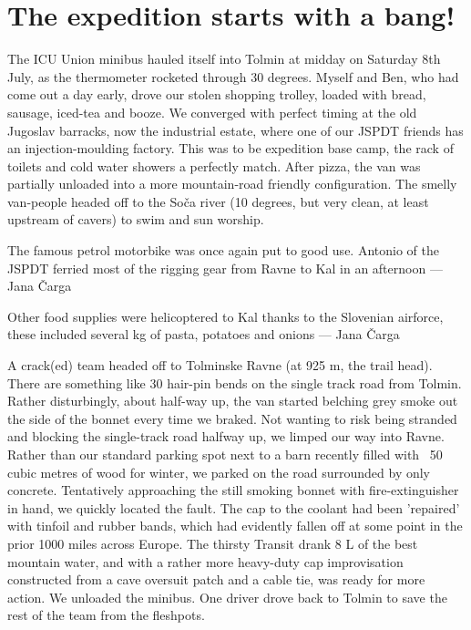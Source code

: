 \section{The expedition starts with a bang!}
The ICU Union minibus hauled itself into Tolmin at midday on Saturday 8th July, as the thermometer rocketed through 30 degrees. Myself and Ben, who had come out a day early, drove our stolen shopping trolley, loaded with bread, sausage, iced-tea and booze. We converged with perfect timing at the old Jugoslav barracks, now the industrial estate, where one of our JSPDT friends has an injection-moulding factory. This was to be expedition base camp, the rack of toilets and cold water showers a perfectly match. After pizza, the van was partially unloaded into a more mountain-road friendly configuration. The smelly van-people headed off to the Soča river (10 degrees, but very clean, at least upstream of cavers) to swim and sun worship. 

\begin{marginfigure}
\checkoddpage \ifoddpage \forcerectofloat \else \forceversofloat \fi
\centering
{}
\caption{The famous petrol motorbike was once again put to good use. Antonio of the JSPDT ferried most of the rigging gear from Ravne to Kal in an afternoon --- Jana \v{C}arga}
\label{lightning}
\end{marginfigure}

\begin{marginfigure}
\checkoddpage \ifoddpage \forcerectofloat \else \forceversofloat \fi
\centering
{}
\caption{Other food supplies were helicoptered to Kal thanks to the Slovenian airforce, these included several kg of pasta, potatoes and onions --- Jana \v{C}arga}
\label{lightning}
\end{marginfigure}

A crack(ed) team headed off to Tolminske Ravne (at 925 m, the trail head). There are something like 30 hair-pin bends on the single track road from Tolmin. Rather disturbingly, about half-way up, the van started belching  grey smoke out the side of the bonnet every time we braked. Not wanting to risk being stranded and blocking the single-track road halfway up, we limped our way into Ravne. Rather than our standard parking spot next to a barn recently filled with ~50 cubic metres of wood for winter, we parked on the road surrounded by only concrete. Tentatively approaching the still smoking bonnet with fire-extinguisher in hand, we quickly located the fault. The cap to the coolant had been 'repaired' with tinfoil and rubber bands, which had evidently fallen off at some point in the prior 1000 miles across Europe. The thirsty Transit drank 8 L of the best mountain water, and with a rather more heavy-duty cap improvisation constructed from a cave oversuit patch and a cable tie, was ready for more action. We unloaded the minibus. One driver drove back to Tolmin to save the rest of the team from the fleshpots. 

